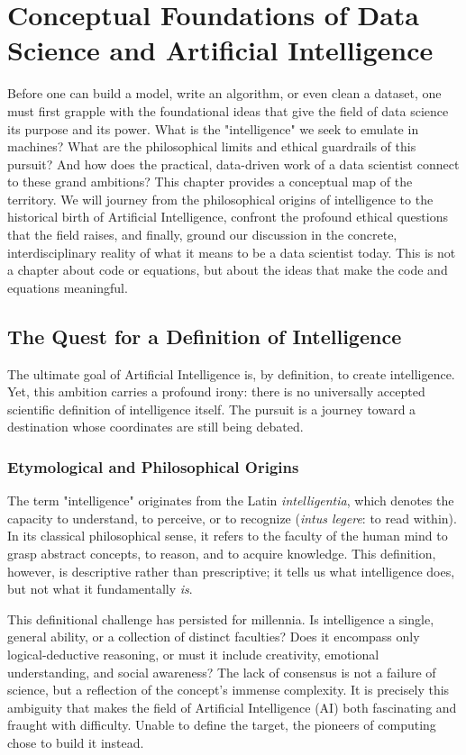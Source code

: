 \chapter{Conceptual Foundations of Data Science and Artificial Intelligence}
\label{chap:foundations}

Before one can build a model, write an algorithm, or even clean a dataset, one must first grapple with the foundational ideas that give the field of data science its purpose and its power. What is the "intelligence" we seek to emulate in machines? What are the philosophical limits and ethical guardrails of this pursuit? And how does the practical, data-driven work of a data scientist connect to these grand ambitions? This chapter provides a conceptual map of the territory. We will journey from the philosophical origins of intelligence to the historical birth of Artificial Intelligence, confront the profound ethical questions that the field raises, and finally, ground our discussion in the concrete, interdisciplinary reality of what it means to be a data scientist today. This is not a chapter about code or equations, but about the ideas that make the code and equations meaningful.

\section{The Quest for a Definition of Intelligence}
\label{sec:what_is_intelligence}
The ultimate goal of Artificial Intelligence is, by definition, to create intelligence. Yet, this ambition carries a profound irony: there is no universally accepted scientific definition of intelligence itself. The pursuit is a journey toward a destination whose coordinates are still being debated.

\subsection*{Etymological and Philosophical Origins}
The term "intelligence" originates from the Latin \textit{intelligentia}, which denotes the capacity to understand, to perceive, or to recognize (\textit{intus legere}: to read within). In its classical philosophical sense, it refers to the faculty of the human mind to grasp abstract concepts, to reason, and to acquire knowledge. This definition, however, is descriptive rather than prescriptive; it tells us what intelligence does, but not what it fundamentally \textit{is}.

This definitional challenge has persisted for millennia. Is intelligence a single, general ability, or a collection of distinct faculties? Does it encompass only logical-deductive reasoning, or must it include creativity, emotional understanding, and social awareness? The lack of consensus is not a failure of science, but a reflection of the concept's immense complexity. It is precisely this ambiguity that makes the field of Artificial Intelligence (AI) both fascinating and fraught with difficulty. Unable to define the target, the pioneers of computing chose to build it instead.

